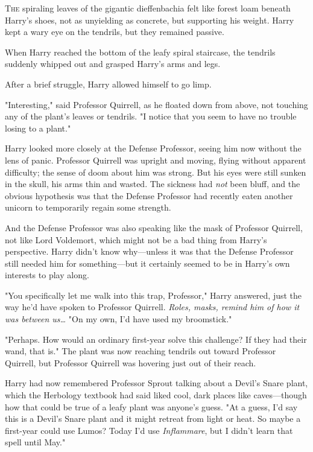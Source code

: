 
\lettrine{T}{he} spiraling 
leaves of the gigantic dieffenbachia felt like forest loam beneath Harry's 
shoes, not as unyielding as concrete, but supporting his weight. Harry kept a 
wary eye on the tendrils, but they remained passive.

When Harry reached the bottom of the leafy spiral staircase, the tendrils 
suddenly whipped out and grasped Harry's arms and legs.

After a brief struggle, Harry allowed himself to go limp.

"Interesting," said Professor Quirrell, as he floated down from above, not 
touching any of the plant's leaves or tendrils. "I notice that you seem to have 
no trouble losing to a plant."

Harry looked more closely at the Defense Professor, seeing him now without the 
lens of panic. Professor Quirrell was upright and moving, flying without 
apparent difficulty; the sense of doom about him was strong. But his eyes were 
still sunken in the skull, his arms thin and wasted. The sickness had 
\emph{not} been bluff, and the obvious hypothesis was that the Defense 
Professor had recently eaten another unicorn to temporarily regain some 
strength.

And the Defense Professor was also speaking like the mask of Professor 
Quirrell, not like Lord Voldemort, which might not be a bad thing from Harry's 
perspective. Harry didn't know why---unless it was that the Defense Professor 
still needed him for something---but it certainly seemed to be in Harry's own 
interests to play along.

"You specifically let me walk into this trap, Professor," Harry answered, just 
the way he'd have spoken to Professor Quirrell. \emph{Roles, masks, remind him 
of how it was between us{\ldots}} "On my own, I'd have used my broomstick."

"Perhaps. How would an ordinary first-year solve this challenge? If they had 
their wand, that is." The plant was now reaching tendrils out toward Professor 
Quirrell, but Professor Quirrell was hovering just out of their reach.

Harry had now remembered Professor Sprout talking about a Devil's Snare plant, 
which the Herbology textbook had said liked cool, dark places like 
caves---though how that could be true of a leafy plant was anyone's guess. "At 
a guess, I'd say this is a Devil's Snare plant and it might retreat from light 
or heat. So maybe a first-year could use Lumos? Today I'd use 
\emph{Inflammare}, but I didn't learn that spell until May."

